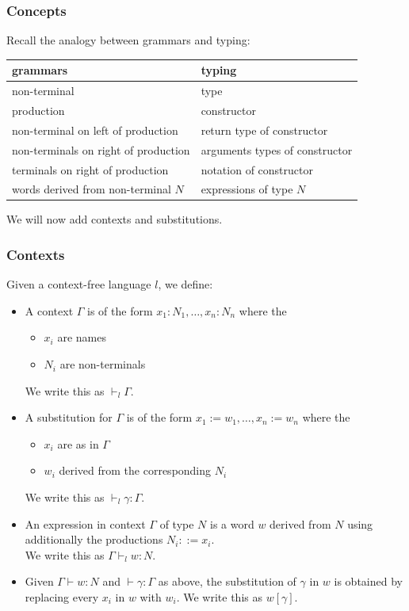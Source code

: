 \documentclass{beamer}
\renewcommand{\emph}[1]{\alert{#1}}
\begin{document}
\begin{frame}\frametitle{Concepts}
Recall the analogy between grammars and typing:

\begin{center}
\begin{tabular}{l|l}
grammars & typing \\
\hline
non-terminal & type \\
production & constructor \\
non-terminal on left of production & return type of constructor \\
non-terminals on right of production & arguments types of constructor \\
terminals on right of production & notation of constructor\\
words derived from non-terminal $N$ & expressions of type $N$
\end{tabular}
\end{center}

We will now add contexts and substitutions.
\end{frame}

\begin{frame}\frametitle{Contexts}
Given a context-free language $l$, we define:

\begin{itemize}
 \item A \emph{context} $\Gamma$ is of the form $x_1:N_1,\ldots,x_n:N_n$ where the
  \begin{itemize}
   \item $x_i$ are names
   \item $N_i$ are non-terminals
  \end{itemize}
  We write this as $\vdash_l \Gamma$.
 \item A \emph{substitution} for $\Gamma$ is of the form $x_1:=w_1,\ldots,x_n:=w_n$ where the
  \begin{itemize}
   \item $x_i$ are as in $\Gamma$
   \item $w_i$ derived from the corresponding $N_i$
  \end{itemize}
  We write this as $\vdash_l \gamma:\Gamma$.
 \item An \emph{expression in context} $\Gamma$ of type $N$ is a word $w$ derived from $N$ using additionally the productions $N_i::= x_i$.\\
 We write this as $\Gamma\vdash_l w:N$.
 \item Given $\Gamma\vdash w:N$ and $\vdash \gamma:\Gamma$ as above, the \emph{substitution of} $\gamma$ in $w$ is obtained by replacing every $x_i$ in $w$ with $w_i$.
 We write this as $w[\gamma]$.
\end{itemize}
\end{frame}
\end{document}
